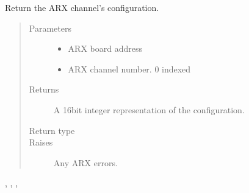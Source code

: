 \documentclass[letterpaper,10pt,english]{sphinxmanual}
\begin{document}
\begin{fulllineitems}
\begin{fulllineitems}
\label{\detokenize{index:lwautils.lwa_arx.ARX.get_chan_cfg}}
Return the ARX channel’s configuration.
\begin{quote}\begin{description}
\item[{Parameters}] \leavevmode\begin{itemize}
\item {} 
 \textendash{} ARX board address

\item {} 
 \textendash{} ARX channel number. 0 indexed

\end{itemize}

\item[{Returns}] \leavevmode
A 16bit integer representation of the configuration.

\item[{Return type}] \leavevmode
{}

\item[{Raises}] \leavevmode
{} \textendash{} Any ARX errors.

\end{description}\end{quote}




{\hyperref[\detokenize{index:lwautils.lwa_arx.ARX.set_chan_cfg}]{}}, {\hyperref[\detokenize{index:lwautils.lwa_arx.ARX.set_all_chan_cfg}]{}}, {\hyperref[\detokenize{index:lwautils.lwa_arx.ARX.set_all_different_chan_cfg}]{}}, {\hyperref[\detokenize{index:lwautils.lwa_arx.ARX.show_chan_cfg}]{}}



\end{fulllineitems}



\end{fulllineitems}
\end{document}
